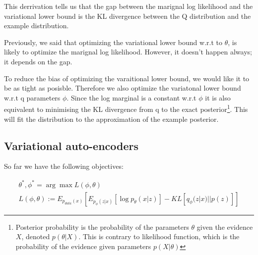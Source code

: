 \documentclass[11pt]{article}
\begin{document}
This derrivation tells us that the gap between the marignal log likelihood and the variational lower bound is the KL divergence between the Q distribution and the example distribution.

Previously, we said that optimizing the variational lower bound w.r.t to $\theta$, is likely to optimize the marignal log likelihood. However, it doesn't happen always; it depends on the gap. 

To reduce the bias of optimizing the varaitional lower bound, we would like it to be as tight as posisble. Therefore we also optimize the variatonal lower bound w.r.t q parameters $\phi$. Since the log marginal is a constant w.r.t $\phi$ it is also equivalent to minimising the KL divergence from q to the exact posterior\footnote{Posterior probability is the probability of the parameters $\theta$ given the evidence $X$, denoted $p(\theta|X)$. This is contrary to likelihood function, which is the probability of the evidence given parameters $p(X|\theta)$}. This will fit the distribution to the approximation of the example posterior.

\subsection{Variational auto-encoders}\label{sect:Variational auto-encoders}

So far we have the following objectives:

\begin{gather}
    \theta^*, \phi^* = \arg \max L(\phi, \theta) \\
    L(\phi, \theta) := E_{p_{data}(x)}[E_{p_\phi(z|x)}[\log p_\theta(x|z)] - KL[q_\phi(z|x)||p(z)]]
\end{gather}
\end{document}
